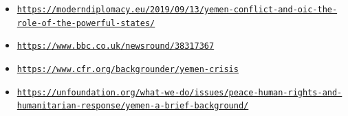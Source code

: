 \documentclass[10pt, letterpaper]{article}
\begin{document}
\begin{itemize}
\item
  
  \texttt{\href{https://moderndiplomacy.eu/2019/09/13/yemen-conflict-and-oic-the-role-of-the-powerful-states/}{{https://moderndiplomacy.eu/2019/09/13/yemen-conflict-and-oic-the-role-of-the-powerful-states/}}}
  
\item
  
  \texttt{\href{https://www.bbc.co.uk/newsround/38317367}{{https://www.bbc.co.uk/newsround/38317367}}}
  
\item
  
  \texttt{\href{https://www.cfr.org/backgrounder/yemen-crisis}{{https://www.cfr.org/backgrounder/yemen-crisis}}}
  
\item
  
  \texttt{\href{https://unfoundation.org/what-we-do/issues/peace-human-rights-and-humanitarian-response/yemen-a-brief-background/}{{https://unfoundation.org/what-we-do/issues/peace-human-rights-and-humanitarian-response/yemen-a-brief-background/}}}
  
\end{itemize}
\end{document}
